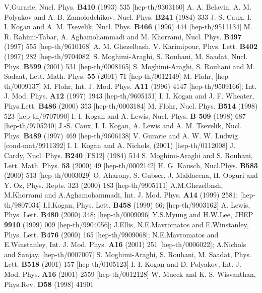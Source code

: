 \documentclass[a4paper,11pt]{article}
\begin{document}
\begin{thebibliography}{99}
 V.Gurarie, Nucl. Phys. {\bf B410} (1993) 535
[hep-th/9303160]
A. A. Belavin, A. M. Polyakov and
A. B. Zamolodchikov, Nucl. Phys. {\bf B241} (1984) 333
 J.-S. Caux, I. I. Kogan and A. M. Tsevelik, Nucl. Phys. {\bf B466}
(1996) 444 [hep-th/9511134]
 M. R. Rahimi-Tabar, A. Aghamohammadi and
M. Khorrami, Nucl. Phys. {\bf B497} (1997) 555 [hep-th/9610168]
 A. M. Ghezelbash, V. Karimipour, Phys. Lett. {\bf B402} (1997)
282 [hep-th/9704082]
S. Moghimi-Araghi, S. Rouhani, M. Saadat, Nucl.
Phys. {\bf B599} (2001) 531 [hep-th/0008165]
 S. Moghimi-Araghi, S. Rouhani and M. Sadaat, Lett.
Math. Phys. {\bf 55} (2001) 71 [hep-th/0012149]
 M. Flohr, [hep-th/0009137]
 M. Flohr, Int. J. Mod. Phys. {\bf A11} (1996) 4147
[hep-th/9509166]; Int. J. Mod. Phys. {\bf A12} (1997) 1943
[hep-th/9605151]
 I. I. Kogan and J. F. Wheater, Phys.Lett. {\bf B486} (2000) 353
 [hep-th/0003184]
 M. Flohr, Nucl. Phys. {\bf B514} (1998) 523
[hep-th/9707090]
 I. I. Kogan and A. Lewis, Nucl. Phys. {\bf B 509}
(1998) 687 [hep-th/9705240]
 J.-S. Caux, I. I. Kogan, A. Lewis and A. M.
Tsevelik, Nucl. Phys. {\bf B489} (1997) 469 [hep-th/9606138]
 V. Gurarie and A. W. W. Ludwig [cond-mat/9911392]
 I. I. Kogan and A. Nichols, (2001) [hep-th/0112008]
 J. Cardy, Nucl. Phys. {\bf B240} [FS12] (1984) 514
 S. Moghimi-Araghi and S. Rouhani, Lett. Math. Phys. {\bf 53} (2000) 49 [hep-th/0002142]
  H. G. Kausch, Nucl.Phys. \textbf{B583} (2000)
513 [hep-th/0003029]
  O. Aharony, S. Gubser, J. Maldacena, H. Ooguri and Y. Oz,
Phys. Repts. 323 (2000) 183 [hep-th/9905111]
     A.M.Ghezelbash, M.Khorrami and A.Aghamohammadi,
    Int. J. Mod. Phys. \textbf{A14} (1999) 2581;  [hep-th/9807034]
  I.I.Kogan,
    Phys. Lett. \textbf{B458} (1999) 66;  [hep-th/9903162]
  A. Lewis,
 Phys. Lett. \textbf{B480} (2000) 348;
    [hep-th/0009096]
 Y.S.Myung and H.W.Lee,
    JHEP \textbf{9910} (1999) 009   [hep-th/9904056];
J.Ellis, N.E.Mavromatos and E.Winstanley,
    Phys. Lett. \textbf{B476} (2000) 165 [hep-th/9909068];
N.E.Mavromatos and E.Winstanley,
    Int. J. Mod. Phys. \textbf{A16} (2001) 251  [hep-th/0006022];
A.Nichols and Sanjay,
   [hep-th/0007007]
 S. Moghimi-Araghi, S. Rouhani, M. Saadat, Phys.
Lett. \textbf{B518} (2001) 157 [hep-th/0105123]
  I. I. Kogan and D. Polyakov, Int. J. Mod. Phys. \textbf{A16} (2001) 2559
 [hep-th/0012128]
 W. Mueck and K. S. Wisvanthan, Phys.Rev. \textbf{D58} (1998) 41901
\end{thebibliography}
\end{document}
